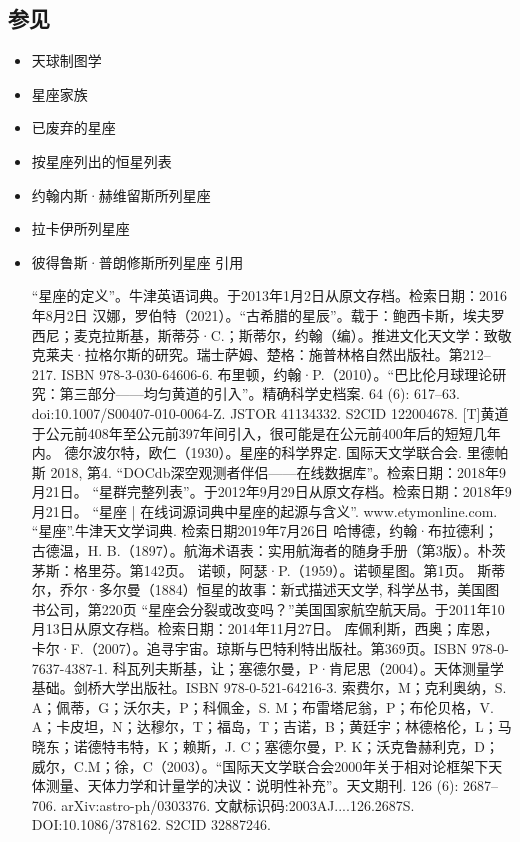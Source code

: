 \subsection{参见}  
\begin{itemize}
\item 天球制图学  
\item 星座家族  
\item 已废弃的星座  
\item 按星座列出的恒星列表  
\item 约翰内斯·赫维留斯所列星座  
\item 拉卡伊所列星座  
\item 彼得鲁斯·普朗修斯所列星座  
引用

 “星座的定义”。牛津英语词典。于2013年1月2日从原文存档。检索日期：2016年8月2日
 汉娜，罗伯特（2021）。“古希腊的星辰”。载于：鲍西卡斯，埃夫罗西尼；麦克拉斯基，斯蒂芬·C.；斯蒂尔，约翰（编）。推进文化天文学：致敬克莱夫·拉格尔斯的研究。瑞士萨姆、楚格：施普林格自然出版社。第212–217. ISBN 978-3-030-64606-6.
 布里顿，约翰·P.（2010）。“巴比伦月球理论研究：第三部分——均匀黄道的引入”。精确科学史档案. 64 (6): 617–63. doi:10.1007/S00407-010-0064-Z. JSTOR 41134332. S2CID 122004678. [T]黄道于公元前408年至公元前397年间引入，很可能是在公元前400年后的短短几年内。
 德尔波尔特，欧仁（1930）。星座的科学界定. 国际天文学联合会.
 里德帕斯 2018, 第4.
 “DOCdb深空观测者伴侣——在线数据库”。检索日期：2018年9月21日。
 “星群完整列表”。于2012年9月29日从原文存档。检索日期：2018年9月21日。
 “星座 | 在线词源词典中星座的起源与含义”. www.etymonline.com.
 “星座”.牛津天文学词典. 检索日期2019年7月26日
 哈博德，约翰·布拉德利；古德温，H. B.（1897）。航海术语表：实用航海者的随身手册（第3版）。朴茨茅斯：格里芬。第142页。
 诺顿，阿瑟·P.（1959）。诺顿星图。第1页。
 斯蒂尔，乔尔·多尔曼（1884）恒星的故事：新式描述天文学, 科学丛书，美国图书公司，第220页
 “星座会分裂或改变吗？”美国国家航空航天局。于2011年10月13日从原文存档。检索日期：2014年11月27日。
 库佩利斯，西奥；库恩，卡尔·F.（2007）。追寻宇宙。琼斯与巴特利特出版社。第369页。ISBN 978-0-7637-4387-1.
 科瓦列夫斯基，让；塞德尔曼，P·肯尼思（2004）。天体测量学基础。剑桥大学出版社。ISBN 978-0-521-64216-3.
 索费尔，M；克利奥纳，S. A；佩蒂，G；沃尔夫，P；科佩金，S. M；布雷塔尼翁，P；布伦贝格，V. A；卡皮坦，N；达穆尔，T；福岛，T；吉诺，B；黄廷宇；林德格伦，L；马晓东；诺德特韦特，K；赖斯，J. C；塞德尔曼，P. K；沃克鲁赫利克，D；威尔，C.M；徐，C（2003）。“国际天文学联合会2000年关于相对论框架下天体测量、天体力学和计量学的决议：说明性补充”。天文期刊. 126 (6): 2687–706. arXiv:astro-ph/0303376. 文献标识码:2003AJ....126.2687S. DOI:10.1086/378162. S2CID 32887246.

\end{itemize}
